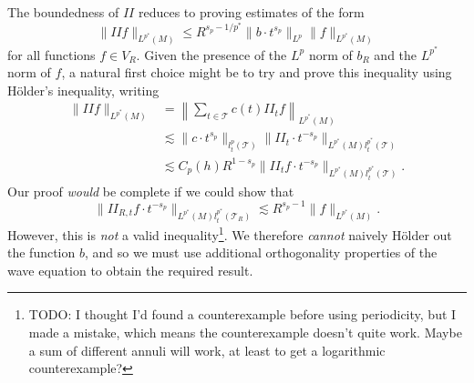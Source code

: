 \begin{itemize}

\end{itemize}
%
The boundedness of $II$ reduces to proving estimates of the form
%
\[ \| II f \|_{L^{p^*}(M)} \leq R^{s_p - 1/p^*} \| b \cdot t^{s_p} \|_{L^p} \| f \|_{L^{p^*}(M)} \]
%
for all functions $f \in V_R$. Given the presence of the $L^p$ norm of $b_R$ and the $L^{p^*}$ norm of $f$, a natural first choice might be to try and prove this inequality using H\"{o}lder's inequality, writing
\begin{align*}
    \| II f \|_{L^{p^*}(M)} &= \left\| \sum_{t \in \mathcal{T}} c(t) II_t f \right\|_{L^{p^*}(M)}\\
    &\lesssim \| c \cdot t^{s_p} \|_{l^p_t(\mathcal{T})} \| II_t \cdot t^{- s_p} \|_{L^{p^*}(M) l^{p^*}_t(\mathcal{T})}\\
    &\lesssim C_p(h) R^{1 - s_p} \| II_t f \cdot t^{-s_p} \|_{L^{p^*}(M) l^{p^*}_t(\mathcal{T})}.
\end{align*}
%
Our proof \emph{would} be complete if we could show that
%
\[ \| II_{R,t} f \cdot t^{-s_p} \|_{L^{p^*}(M) l^{p^*}_t(\mathcal{T}_R)} \lesssim R^{s_p - 1} \| f \|_{L^{p^*}(M)}. \]
%
However, this is \emph{not} a valid inequality\footnote{TODO: I thought I'd found a counterexample before using periodicity, but I made a mistake, which means the counterexample doesn't quite work. Maybe a sum of different annuli will work, at least to get a logarithmic counterexample?}. We therefore \emph{cannot} naively H\"{o}lder out the function $b$, and so we must use additional orthogonality properties of the wave equation to obtain the required result.

